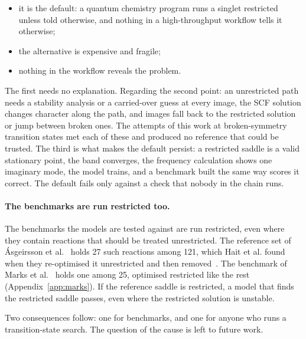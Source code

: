 \begin{itemize}
  \item it is the default: a quantum chemistry program runs a singlet
    restricted unless told otherwise, and nothing in a high-throughput
    workflow tells it otherwise;
  \item the alternative is expensive and fragile;
  \item nothing in the workflow reveals the problem.
\end{itemize}

The first needs no explanation. Regarding the second point: an
unrestricted path needs a stability analysis or a carried-over guess
at every image, the SCF solution changes character along the path, and
images fall back to the restricted solution or jump between broken
ones. The attempts of this work at broken-symmetry transition states
met each of these and produced no reference that could be trusted. The
third is what makes the default persist: a restricted saddle is a
valid stationary point, the band converges, the frequency calculation
shows one imaginary mode, the model trains, and a benchmark built the
same way scores it correct. The default fails only against a check
that nobody in the chain runs.

\paragraph{The benchmarks are run restricted too.} The benchmarks the models
are tested against are run restricted, even where they contain
reactions that should be treated unrestricted. The reference set of
\'Asgeirsson et al.~\cite{asgeirsson2021} holds 27 such reactions
among 121, which Hait et al. found when they re-optimised it
unrestricted and then removed~\cite{hait2025}. The benchmark of Marks
et al.~\cite{marks2026} holds one among 25, optimised restricted like
the rest (Appendix~\ref{app:marks}). If the reference saddle is
restricted, a model that finds the restricted saddle passes, even
where the restricted solution is unstable.

Two consequences follow: one for benchmarks, and one for anyone who
runs a transition-state search. The question of the cause is left to
future work.

